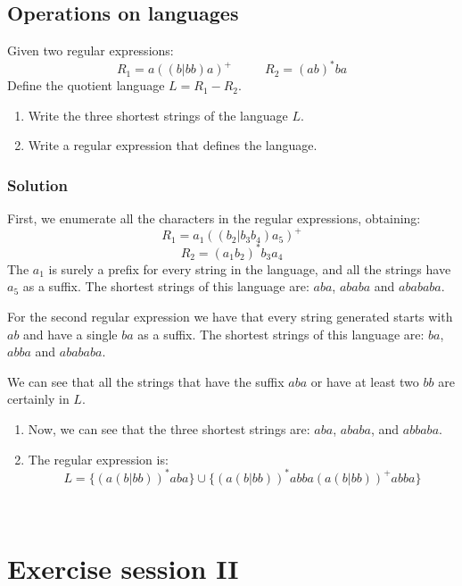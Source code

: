 \documentclass[12pt, a4paper]{report}
\newtheorem[style=M, bodystyle=\normalfont]{theorem}{Theorem}
\newtheorem[style=M, bodystyle=\normalfont]{corollary}{Corollary}
\newtheorem[style=M, bodystyle=\normalfont]{lemma}{Lemma}
\newtheorem[style=M, bodystyle=\normalfont]{definition}{Definition}
\begin{document}
    \section{Operations on languages}
        Given two regular expressions: 
        \[R_1=a((b|bb)a)^{+} \:\:\:\:\:\:\:\:\:\:\:\: R_2=(ab)^{*}ba\]
        Define the quotient language $L=R_1-R_2$. 
        \begin{enumerate}
            \item Write the three shortest strings of the language $L$.
            \item Write a regular expression that defines the language. 
        \end{enumerate}
    \subsection*{Solution}
        First, we enumerate all the characters in the regular expressions, obtaining: 
        \[R_1=a_1((b_2|b_3b_4)a_5)^{+}\]
        \[R_2=(a_1b_2)^{*}b_3a_4\]
        The $a_1$ is surely a prefix for every string in the language, and all the strings have $a_5$ as a suffix. The shortest strings of this language are: $aba$, $ababa$ and $abababa$. 
        
        For the second regular expression we have that every string generated starts with $ab$ and have a single $ba$ as a suffix. The shortest strings of this language are: $ba$, $abba$ and $abababa$. 
        
        We can see that all the strings that have the suffix $aba$ or have at least two $bb$ are certainly in $L$. 

        \begin{enumerate}
            \item Now, we can see that the three shortest strings are: $aba$, $ababa$, and $abbaba$. 
            \item The regular expression is: 
                \[L=\{(a(b|bb))^{*}aba\} \cup \{(a(b|bb))^{*}abba(a(b|bb))^{+}abba\}\]
        \end{enumerate}    
    
\newpage

\

\newpage

\chapter{Exercise session II}
\end{document}
